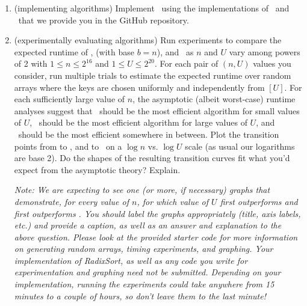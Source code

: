 \documentclass[11pt]{article}
\begin{document}
\begin{enumerate}
\begin{enumerate}
            \item (implementing algorithms)
            Implement \RadixSort\ using the implementations of \CountingSort\ and \BC\ that we provide you in the GitHub repository. 
  

            \item (experimentally evaluating algorithms) Run experiments to compare the expected runtime of \CountingSort, \RadixSort (with base $b=n$), and \MergeSort\ as $n$ and $U$ vary among powers of 2 with $1\leq n\leq 2^{16}$ and $1\leq U\leq 2^{20}$.  For each pair of $(n,U)$ values you consider, run multiple trials to estimate the expected runtime over random arrays where the keys are chosen uniformly and independently from $[U]$.  For each sufficiently large value of $n$, the asymptotic (albeit worst-case) runtime analyses suggest that \CountingSort\ should be the most efficient algorithm for small values of $U$, \MergeSort\ should be the most efficient algorithm for large values of $U$, and \RadixSort\ should be the most efficient somewhere in between.  Plot the transition points from \CountingSort to \RadixSort, and \RadixSort to \MergeSort\ on a $\log n$ vs. $\log U$ scale (as usual our logarithms are base 2).  Do the shapes of the resulting transition curves fit what you'd expect from the asymptotic theory?  Explain.  %
            
            \textit{Note: We are expecting to see one (or more, if necessary) graphs that demonstrate, for every value of $n$, for which value of $U$ \RadixSort first outperforms \CountingSort and \MergeSort first outperforms \RadixSort. You should label the graphs appropriately (title, axis labels, etc.) and provide a caption, as well as an answer and explanation to the above question. Please look at the provided starter code for more information on generating random arrays, timing experiments, and graphing. Your implementation of RadixSort, as well as any code you write for experimentation and graphing need not be submitted.  Depending on your implementation, running the experiments could take anywhere from 15 minutes to a couple of hours, so don't leave them to the last minute!}   


\end{enumerate}
\end{enumerate}
\end{document}
